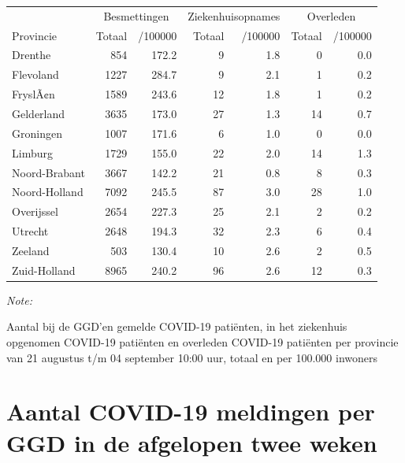 \documentclass[
  english,
  man,floatsintext]{apa6}
\begin{document}
\begin{table}
\centering
\begin{threeparttable}
\begin{tabular}{lrrrrrr}
\toprule
\multicolumn{1}{c}{ } & \multicolumn{2}{c}{Besmettingen} & \multicolumn{2}{c}{Ziekenhuisopnames} & \multicolumn{2}{c}{Overleden} \\
\cmidrule(l{3pt}r{3pt}){2-3} \cmidrule(l{3pt}r{3pt}){4-5} \cmidrule(l{3pt}r{3pt}){6-7}
Provincie & Totaal & /100000 & Totaal & /100000 & Totaal & /100000\\
\midrule
Drenthe & 854 & 172.2 & 9 & 1.8 & 0 & 0.0\\
Flevoland & 1227 & 284.7 & 9 & 2.1 & 1 & 0.2\\
FryslÃ¢n & 1589 & 243.6 & 12 & 1.8 & 1 & 0.2\\
Gelderland & 3635 & 173.0 & 27 & 1.3 & 14 & 0.7\\
Groningen & 1007 & 171.6 & 6 & 1.0 & 0 & 0.0\\
Limburg & 1729 & 155.0 & 22 & 2.0 & 14 & 1.3\\
Noord-Brabant & 3667 & 142.2 & 21 & 0.8 & 8 & 0.3\\
Noord-Holland & 7092 & 245.5 & 87 & 3.0 & 28 & 1.0\\
Overijssel & 2654 & 227.3 & 25 & 2.1 & 2 & 0.2\\
Utrecht & 2648 & 194.3 & 32 & 2.3 & 6 & 0.4\\
Zeeland & 503 & 130.4 & 10 & 2.6 & 2 & 0.5\\
Zuid-Holland & 8965 & 240.2 & 96 & 2.6 & 12 & 0.3\\
\bottomrule
\end{tabular}
\begin{tablenotes}
\item \textit{Note: } 
\item Aantal bij de GGD’en gemelde COVID-19 patiënten, in het ziekenhuis opgenomen COVID-19 patiënten en overleden COVID-19 patiënten per provincie van 21 augustus t/m 04 september 10:00 uur, totaal en per 100.000 inwoners
\end{tablenotes}
\end{threeparttable}
\end{table}

\newpage

\hypertarget{aantal-covid-19-meldingen-per-ggd-in-de-afgelopen-twee-weken}{%
\section{Aantal COVID-19 meldingen per GGD in de afgelopen twee weken}\label{aantal-covid-19-meldingen-per-ggd-in-de-afgelopen-twee-weken}}
\end{document}
